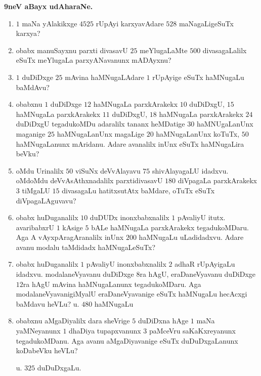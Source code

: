 \medskip

\begin{center}
{\large\bf 9neV aBayx udAharaNe.}
\end{center}

\begin{enumerate}[\rm(1)]
\item $1$ maNa yAlakikxge $4525$ rUpAyi karxyavAdare $528$ maNagaLigeSuTx karxya?

\item obabx manuSayxnu parxti divasavU $25$ meYlugaLaMte $500$ divasagaLalilx eSuTx meYlugaLa parxyANavanunx mADAyxnu?

\item $1$ duDiDxge $25$ mAvina haMNugaLAdare $1$ rUpAyige eSuTx haMNugaLu baMdAvu?

\item obabxnu $1$ duDiDxge $12$ haMNugaLa parxkArakekx $10$ duDiDxgU, $15$ haMNugaLa parxkArakekx $11$ duDiDxgU, $18$ haMNugaLa parxkArakekx $24$ duDiDxgU tegadukoMDu adaralilx tananx heMDatige $30$ haMNUgaLanUnx maganige $25$ haMNugaLanUnx magaLige $20$ haMNugaLanUnx koTuTx, $50$ haMNugaLanunx mAridanu. Adare avanalilx inUnx eSuTx haMNugaLira beVku?

\item oMdu Urinalilx $50$ viSuNx deVvAlayavu $75$ shivAlayagaLU idadxvu. oMdoMdu deVvAsAthxnadalilx parxti\break divasavU $180$ diVpagaLa parxkArakekx $3$ tiMgaLU $15$ divasagaLu hatitxsutAtx baMdare, oTuTx eSuTx diVpagaLAguvavu?

\item obabx huDuganalilx $10$ duDUDx inonxbabxnalilx $1$ pAvaliyU itutx. avaribabxrU $1$ kAsige $5$ bALe haMNugaLa parxkArakekx tegadukoMDaru. Aga A vAyxpAragAranalilx inUnx $200$ haMNugaLu uLadidadxvu. Adare avanu modalu taMdidadx haMNugaLeSuTx?

\item obabx huDuganalilx $1$ pAvaliyU inonxbabxnalilx $2$ adhaR rUpAyigaLu idadxvu. modalaneVyavanu duDiDxge $8$ra hAgU, eraDaneVyavanu duDiDxge $12$ra hAgU mAvina haMNugaLanunx tegadukoMDaru. Aga modalaneVyavanigiMyalU eraDaneVyavanige eSuTx haMNugaLu hecAcxgi baMdavu heVLu? \hfill u. $480$ haMNugaLu

\item obabxnu aMgaDiyalilx dara sheVrige $5$ duDiDxna hAge $1$ maNa yaMNeyanunx $1$ dhaDiya tupapxvanunx $3$ paMceVru saKaKxreyanunx tegadukoMDanu. Aga avanu aMgaDiyavanige eSuTx duDuDxgaLanunx koDabeVku heVLu? 

\hfill u. $325$ duDuDxgaLu. 


\end{enumerate}
